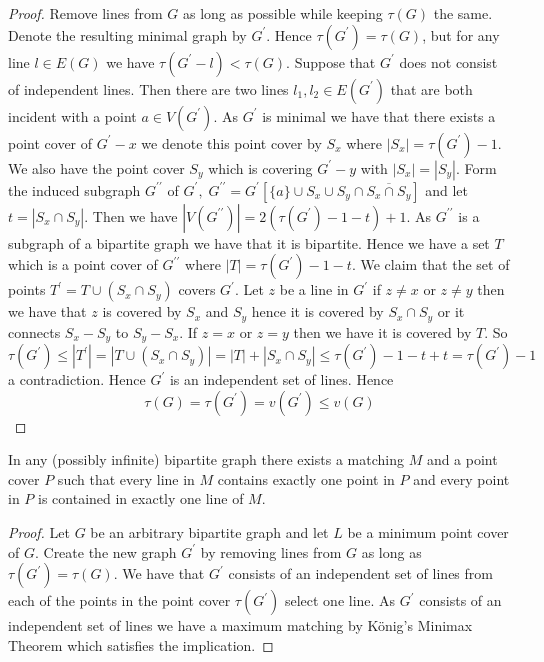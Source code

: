 \documentclass[12pt]{article}
\newenvironment{theorem}[2][Theorem]{\begin{trivlist}
\item[\hskip \labelsep {\bfseries #1}\hskip \labelsep {\bfseries #2.}]}{\end{trivlist}}
\begin{document}
\begin{proof}
    Remove lines from $G$ as long as possible while keeping $\tau(G)$ the same. Denote the resulting minimal graph by $G^\prime$. Hence $\tau(G^\prime)=\tau(G)$, but for any line $l\in E(G)$ we have $\tau(G^\prime -l)<\tau(G)$. Suppose that $G^\prime$ does not consist of independent lines. Then there are two lines $l_1, l_2 \in E(G^\prime)$ that are both incident with a point $a \in V(G^\prime)$. As $G^\prime$ is minimal we have that there exists a point cover of $G^\prime-x$ we denote this point cover by $S_x$ where $|S_x|=\tau(G^\prime)-1$. We also have the point cover $S_y$ which is covering $G^\prime -y$ with $|S_x|=|S_y|$.
    Form the induced subgraph $G^{\prime \prime}$ of $G^\prime, \; G^{\prime \prime}=G^\prime[\{a\}\cup S_x\cup S_y \cap \overline{S_x \cap S_y}]$ and let $t=|S_x \cap S_y|$. Then we have $|V(G^{\prime \prime})|=2(\tau(G^\prime)-1 -t)+1$. As $G^{\prime \prime}$ is a subgraph of a bipartite graph we have that it is bipartite. Hence we have a set $T$ which is a point cover of $G^{\prime \prime}$ where $|T|=\tau(G^\prime)-1 -t$.
    We claim that the set of points $T^\prime = T \cup (S_x \cap S_y)$ covers $G^\prime$. Let $z$ be a line in $G^\prime$ if $z\not = x $ or $z\not = y$ then we have that $z$ is covered by $S_x$ and $S_y$ hence it is covered by $S_x \cap S_y$ or it connects $S_x-S_y$ to $S_y-S_x$. If $z=x$ or $z=y$ then we have it is covered by $T$. So $\tau(G^\prime)\leq |T^\prime|= |T\cup (S_x\cap S_y)|=|T|+|S_x\cap S_y|\leq\tau(G^\prime)-1-t+t=\tau(G^\prime)-1$ a contradiction. Hence $G^\prime$ is an independent set of lines. Hence $$\tau(G)=\tau(G^\prime)=v(G^\prime)\leq v(G)$$

\end{proof}


\begin{theorem}
    {1.1.2}

    In any (possibly infinite) bipartite graph there exists a matching $M$ and a point cover $P$ such that every line in $M$ contains exactly one point in $P$ and every point in $P$ is contained in exactly one line of $M$.
\end{theorem}

\begin{proof}
    Let $G$ be an arbitrary bipartite graph and let $L$ be a minimum point cover of $G$. Create the new graph $G^{\prime}$ by removing lines from $G$ as long as $\tau(G^\prime)=\tau(G)$. We have that $G^\prime$ consists of an independent set of lines from each of the points in the point cover $\tau(G^\prime)$ select one line. As $G^{\prime}$ consists of an independent set of lines we have a maximum matching by König's Minimax Theorem which satisfies the implication.
\end{proof}
\end{document}
